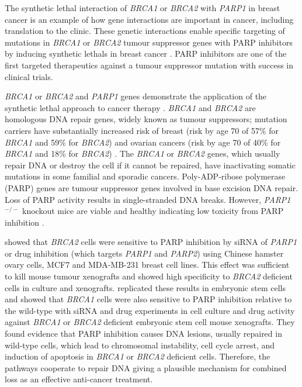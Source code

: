 The \gls{synthetic lethal} interaction of \textit{BRCA1} or \textit{BRCA2} with \textit{PARP1} in breast cancer is an example of how gene interactions are important in cancer, including translation to the clinic. These genetic interactions enable specific targeting of mutations in \textit{BRCA1} or \textit{BRCA2} tumour suppressor genes with PARP inhibitors by inducing \glspl{synthetic lethal} in breast cancer \citep{Farmer2005}. PARP inhibitors are one of the first targeted therapeutics against a tumour suppressor mutation with success in clinical trials. 

\textit{BRCA1} or \textit{BRCA2} and \textit{PARP1} genes demonstrate the application of the \gls{synthetic lethal} approach to cancer therapy \citet{Ashworth2008, Kaelin2005}. \textit{BRCA1} and \textit{BRCA2} are homologous DNA repair genes, widely known as tumour suppressors; mutation carriers have substantially increased risk of breast (risk by age 70 of 57\% for \textit{BRCA1} and 59\% for \textit{BRCA2}) and ovarian cancers (risk by age 70 of 40\% for \textit{BRCA1} and 18\% for \textit{BRCA2}) \citep{Chen2007}. The \textit{BRCA1} or \textit{BRCA2} genes, which usually repair DNA or destroy the cell if it cannot be repaired, have inactivating somatic mutations in some familial and sporadic cancers. Poly-ADP-ribose polymerase (PARP) genes are tumour suppressor genes involved in base excision DNA repair. Loss of PARP activity results in single-stranded DNA breaks. However, \textit{PARP1}$^{-/-}$ knockout mice are viable and healthy indicating low toxicity from PARP inhibition \citep{Bryant2005}.  

\citet{Bryant2005} showed that \textit{BRCA2} cells were sensitive to PARP inhibition by siRNA of \textit{PARP1} or drug inhibition (which targets \textit{PARP1} and \textit{PARP2}) using Chinese hamster ovary cells, MCF7 and MDA-MB-231 breast cell lines. This effect was sufficient to kill mouse tumour xenografts and showed high specificity to \textit{BRCA2} deficient cells in culture and xenografts. \citet{Farmer2005} replicated these results in embryonic stem cells and showed that \textit{BRCA1} cells were also sensitive to PARP inhibition relative to the wild-type with siRNA and drug experiments in cell culture and drug activity against \textit{BRCA1} or \textit{BRCA2} deficient embryonic stem cell mouse xenografts. They found evidence that PARP inhibition causes DNA lesions, usually repaired in wild-type cells, which lead to chromosomal instability, cell cycle arrest, and induction of apoptosis in \textit{BRCA1} or \textit{BRCA2} deficient cells. Therefore, the pathways cooperate to repair DNA giving a plausible mechanism for combined loss as an effective anti-cancer treatment.  

